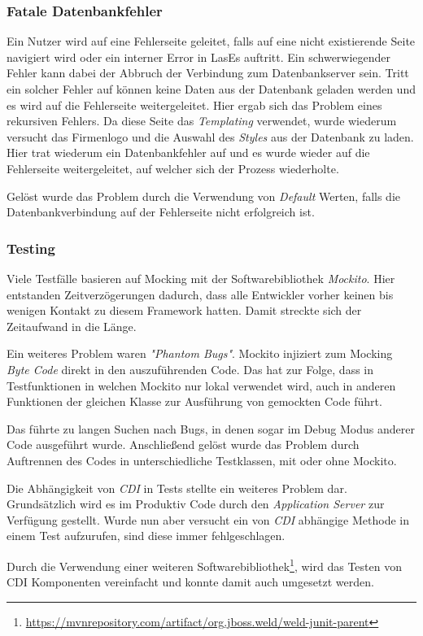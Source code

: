 \subsubsection{Fatale Datenbankfehler}

Ein Nutzer wird auf eine Fehlerseite geleitet, falls auf eine nicht existierende Seite navigiert wird oder ein interner Error in LasEs auftritt.
Ein schwerwiegender Fehler kann dabei der Abbruch der Verbindung zum Datenbankserver sein.
Tritt ein solcher Fehler auf können keine Daten aus der Datenbank geladen werden und es wird auf die Fehlerseite weitergeleitet. Hier ergab sich das Problem eines rekursiven Fehlers.\newline
Da diese Seite das \emph{Templating} verwendet, wurde wiederum versucht das Firmenlogo und die Auswahl des \emph{Styles}  aus der Datenbank zu laden. Hier trat wiederum ein Datenbankfehler auf und es wurde wieder auf die Fehlerseite weitergeleitet, auf welcher sich der Prozess wiederholte.

Gelöst wurde das Problem durch die Verwendung von \emph{Default} Werten, falls die Datenbankverbindung auf der Fehlerseite nicht erfolgreich ist.

\subsubsection{Testing}

Viele Testfälle basieren auf Mocking mit der Softwarebibliothek \emph{Mockito}. Hier entstanden Zeitverzögerungen dadurch, dass alle Entwickler vorher keinen bis wenigen Kontakt zu diesem Framework hatten. Damit streckte sich der Zeitaufwand in die Länge.

Ein weiteres Problem waren \emph{"Phantom Bugs"}. Mockito injiziert zum Mocking \emph{Byte Code} direkt in den auszuführenden Code. Das hat zur Folge, dass in Testfunktionen in welchen Mockito nur lokal verwendet wird, auch
in anderen Funktionen der gleichen Klasse zur Ausführung von gemockten Code führt.

Das führte zu langen Suchen nach Bugs, in denen sogar im Debug Modus anderer Code ausgeführt wurde. Anschließend gelöst wurde das Problem durch Auftrennen des Codes in unterschiedliche Testklassen, mit oder ohne Mockito.\newline

Die Abhängigkeit von \emph{CDI} in Tests stellte ein weiteres Problem dar. Grundsätzlich wird es im Produktiv Code durch den \emph{Application Server} zur Verfügung gestellt. Wurde nun aber versucht ein von \emph{CDI} abhängige Methode in einem Test aufzurufen, sind diese immer fehlgeschlagen.

Durch die Verwendung einer weiteren Softwarebibliothek\footnote{\url{https://mvnrepository.com/artifact/org.jboss.weld/weld-junit-parent}}, wird das Testen von CDI Komponenten vereinfacht und konnte damit auch umgesetzt werden.
